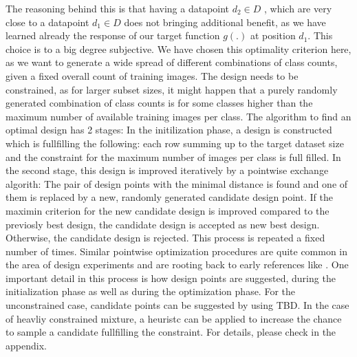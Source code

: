 \documentclass{article} %
\begin{document}
The reasoning behind this is that having a datapoint $d_2 \in D$ , which are very close to a datapoint $d_1 \in D$ does not bringing additional benefit, as we have learned already the response of
our target function $g(.)$ at position $d_1$.
This choice is to a big degree subjective. We have chosen this optimality criterion here, as we want to generate a wide spread of different combinations of class counts, given a fixed overall count of training images.
The design needs to be constrained, as for larger subset sizes, it might happen that a purely randomly generated combination of class counts is for some classes higher than the maximum number of available training images per class.
The algorithm to find an optimal design has 2 stages: In the initilization phase, a design is constructed which is fullfilling the following: each row summing up to the target dataset size and the constraint for the maximum number of images per class is full filled.
In the second stage, this design is improved iteratively by a pointwise exchange algorith: The pair of design points with the minimal distance is found and one of them is replaced by a new, randomly generated candidate design point.
If the maximin criterion for the new candidate design is improved compared to the previosly best design, the candidate design is accepted as new best design.
Otherwise, the candidate design is rejected. This process is repeated a fixed number of times.
Similar pointwise optimization procedures are quite common in the area of design experiments and are rooting back to early references like \cite{fedorov1972theory}.
One important detail in this process is how design points are suggested, during the initialization phase as well as during the optimization phase.
For the unconstrained case, candidate points can be suggested by using TBD. In the case of heavliy constrained mixture, a heuristc can be applied to increase the chance to sample a candidate fullfilling the constraint. For details, please check in the appendix.
\end{document}
